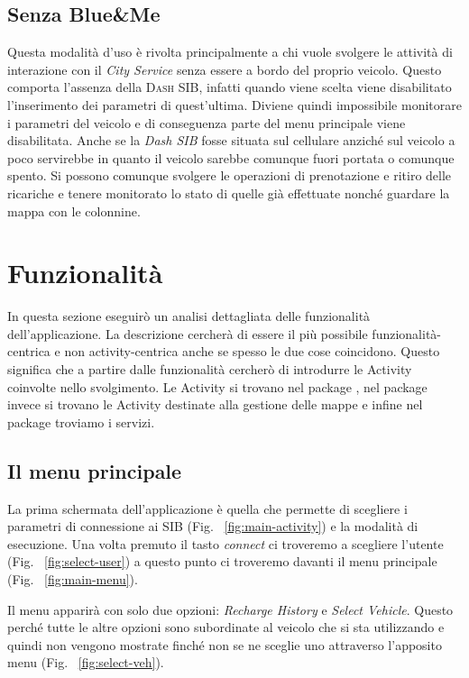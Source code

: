 \subsection{Senza Blue\&{}Me}\label{subsec:noblueme}

Questa modalità d'uso è rivolta principalmente a chi vuole svolgere le attività di interazione con il \emph{City Service} senza essere a bordo del proprio veicolo. Questo comporta l'assenza della \textsc{Dash SIB}, infatti quando viene scelta viene disabilitato l'inserimento dei parametri di quest'ultima. Diviene quindi impossibile monitorare i parametri del veicolo e di conseguenza parte del menu principale viene disabilitata. Anche se la \emph{Dash SIB} fosse situata sul cellulare anziché sul veicolo a poco servirebbe in quanto il veicolo sarebbe comunque fuori portata o comunque spento. Si possono comunque svolgere le operazioni di prenotazione e ritiro delle ricariche e tenere monitorato lo stato di quelle già effettuate nonché guardare la mappa con le colonnine.


\section{Funzionalità}

In questa sezione eseguirò un analisi dettagliata delle funzionalità dell'applicazione. La descrizione cercherà di essere il più possibile funzionalità-centrica e non activity-centrica anche se spesso le due cose coincidono. Questo significa che a partire dalle funzionalità cercherò di introdurre le Activity coinvolte nello svolgimento.
Le Activity si trovano nel package , nel package  invece si trovano le Activity destinate alla gestione delle mappe e infine nel package  troviamo i servizi. 

\subsection{Il menu principale}

La prima schermata dell'applicazione è quella che permette di scegliere i parametri di connessione ai SIB (Fig. ~\ref{fig:main-activity})  e la modalità di esecuzione. Una volta premuto il tasto \emph{connect} ci troveremo a scegliere l'utente (Fig. ~\ref{fig:select-user}) a questo punto ci troveremo davanti il menu principale (Fig. ~\ref{fig:main-menu}).

Il menu apparirà con solo due opzioni: \emph{Recharge History} e \emph{Select Vehicle}. Questo perché tutte le altre opzioni sono subordinate al veicolo che si sta utilizzando e quindi non vengono mostrate finché non se ne sceglie uno attraverso l'apposito menu (Fig. ~\ref{fig:select-veh}). 

